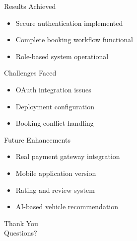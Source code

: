 \documentclass[aspectratio=169]{beamer}
\begin{document}

\begin{frame}{Results Achieved}
\begin{itemize}
    \item Secure authentication implemented
    \item Complete booking workflow functional
    \item Role-based system operational
\end{itemize}
\end{frame}

\begin{frame}{Challenges Faced}
\begin{itemize}
    \item OAuth integration issues
    \item Deployment configuration
    \item Booking conflict handling
\end{itemize}
\end{frame}

\begin{frame}{Future Enhancements}
\begin{itemize}
    \item Real payment gateway integration
    \item Mobile application version
    \item Rating and review system
    \item AI-based vehicle recommendation
\end{itemize}
\end{frame}

\begin{frame}
    \centering
    \Huge Thank You \\
    \vspace{0.5cm}
    Questions?
\end{frame}
\end{document}
